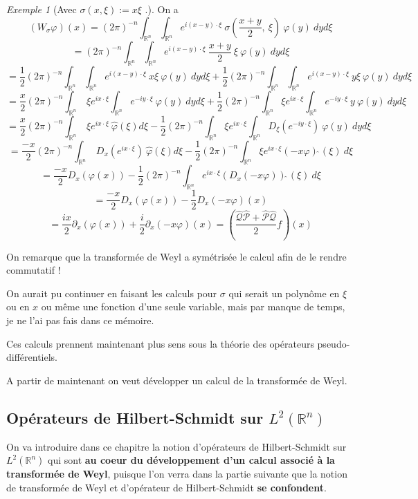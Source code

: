 \documentclass[a4paper, 12pt]{report}
\newcommand{\R}{\mathbb{R}} %
\renewcommand{\.}{\cdot} %
\theoremstyle{break}
\theoremstyle{remark}
\newtheorem{exemple}{Exemple}
\theoremstyle{proofstyle}
\begin{document}
\begin{exemple}[Avec $\sigma (x, \xi) := x \xi$ .]
    On a
    $$(W_\sigma \varphi)(x)=(2 \pi)^{-n} \int_{\R^n} \int_{\R^n} e^{i(x-y) \. \xi}~ \sigma(\frac{x+y}{2}, ~\xi) ~ \varphi(y) ~dy d\xi$$
    $$= (2 \pi)^{-n} \int_{\R^n} \int_{\R^n} e^{i(x-y) \. \xi} ~ \frac{x+y}{2} ~\xi ~ \varphi(y) ~dy d\xi$$
    $$= \frac{1}{2}(2 \pi)^{-n} \int_{\R^n} \int_{\R^n} e^{i(x-y) \. \xi} ~ x \xi ~ \varphi(y) ~dy d\xi+\frac{1}{2}(2 \pi)^{-n} \int_{\R^n} \int_{\R^n} e^{i(x-y) \. \xi} ~ y \xi ~ \varphi(y) ~dy d\xi$$
    $$= \frac{x}{2}(2 \pi)^{-n} \int_{\R^n} ~ \xi e^{i x \. \xi}\int_{\R^n} e^{-iy \. \xi} ~ \varphi(y) ~dy d\xi+\frac{1}{2}(2 \pi)^{-n} \int_{\R^n}  \xi e^{ix \. \xi}\int_{\R^n} e^{-iy \. \xi} ~ y ~ \varphi(y) ~dy d\xi$$
    $$= \frac{x}{2}(2 \pi)^{-n} \int_{\R^n} ~ \xi e^{i x \. \xi} ~ \hat{\varphi} (\xi) d\xi-\frac{1}{2}(2 \pi)^{-n} \int_{\R^n}  \xi e^{ix \. \xi}\int_{\R^n} D_\xi(e^{-iy \. \xi})~ \varphi(y) ~dy d\xi$$
    $$= \frac{-x}{2}(2 \pi)^{-n} \int_{\R^n} ~ D_x(e^{i x \. \xi}) ~ \hat{\varphi} (\xi) d\xi-\frac{1}{2}(2 \pi)^{-n} \int_{\R^n}  \xi e^{ix \. \xi} (-x\varphi) \hat{~}(\xi) ~ d\xi$$
    $$= \frac{-x}{2} D_x(\varphi (x))-\frac{1}{2}(2 \pi)^{-n} \int_{\R^n} e^{ix \. \xi} (D_x(-x\varphi)) \hat{~}(\xi) ~ d\xi$$
    $$= \frac{-x}{2} D_x(\varphi (x))-\frac{1}{2} D_x(-x\varphi)(x)$$
    $$= \frac{ix}{2} \partial_x(\varphi (x))+\frac{i}{2} \partial_x(-x\varphi)(x) = (\frac{\hat{\mathcal{Q}}\hat{\mathcal{P}} + \hat{\mathcal{P}}\hat{\mathcal{Q}}}{2}f)(x)$$
\end{exemple}

On remarque que la transformée de Weyl a symétrisée le calcul afin de le rendre commutatif !

On aurait pu continuer en faisant les calculs pour $\sigma$ qui serait un polynôme en $\xi$ ou en $x$ ou même une fonction d'une seule variable, mais par manque de temps, je ne l'ai pas fais dans ce mémoire.\vspace{5pt}

Ces calculs prennent maintenant plus sens sous la théorie des opérateurs pseudo-différentiels.


A partir de maintenant on veut développer un calcul de la transformée de Weyl.
\subsection{Opérateurs de Hilbert-Schmidt sur $L^2(\R^n)$}
On va introduire dans ce chapitre la notion d'opérateurs de Hilbert-Schmidt sur $L^2(\R^n)$ qui sont \textbf{au coeur du développement d'un calcul associé à la transformée de Weyl}, puisque l'on verra dans la partie suivante que la notion de transformée de Weyl et d'opérateur de Hilbert-Schmidt \textbf{se confondent}.
\end{document}
